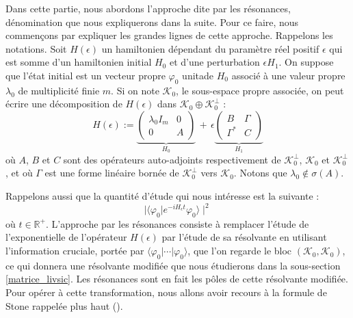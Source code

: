 \documentclass[12pt,openany,a4paper, titlepage]{article}
\newcommand{\R}{\mathbb{R}}
\newcommand{\vp}{\varphi}
\theoremstyle{definition}
\theoremstyle{definition}
\theoremstyle{definition}
\theoremstyle{definition}
\theoremstyle{definition}
\theoremstyle{definition}
\begin{document}
Dans cette partie, nous abordons l'approche dite par les résonances, dénomination que nous expliquerons dans la suite. Pour ce faire, nous commençons par expliquer les grandes lignes de cette approche.
Rappelons les notations. Soit $H(\epsilon)$ un hamiltonien dépendant du paramètre réel positif $\epsilon$ qui est somme d'un hamiltonien initial $H_0$ et d'une perturbation $\epsilon H_1$. On suppose que l'état initial est un vecteur propre $\vp_0$ unitade $H_0$ associé à une valeur propre $\lambda_0$ de multiplicité finie $m$. Si on note $\mathcal{K}_0$, le sous-espace propre associée, on peut écrire une décomposition de $H(\epsilon)$ dans $\mathcal{K}_0 \oplus \mathcal{K}_0^\perp$ : 
$$H(\epsilon) := 
\underbrace{\begin{pmatrix}
\lambda_0I_m & 0 \\
0    & A 
\end{pmatrix}}_{H_0} \,+\, \epsilon
\underbrace{\begin{pmatrix}
B        & \Gamma \\
\Gamma^* &  C
\end{pmatrix}}_{H_1}$$
où $A$, $B$ et $C$ sont des opérateurs auto-adjoints respectivement de $\mathcal{K}_0^\perp$, $\mathcal{K}_0$ et $\mathcal{K}_0^\perp$, et où $\Gamma$ est une forme linéaire bornée de $\mathcal{K}_0^\perp$ vers $\mathcal{K}_0$. Notons que $\lambda_0\notin\sigma(A)$. 

Rappelons aussi que la quantité d'étude qui nous intéresse est la suivante : 
\begin{equation}
    \mid \langle \vp_0 | e^{-iH_\epsilon t} \vp_0 \rangle\mid^2
\end{equation}
où $t\in\R^+$. L'approche par les résonances consiste à remplacer l'étude de l'exponentielle de l'opérateur $H(\epsilon)$ par l'étude de sa résolvante en utilisant l'information cruciale, portée par $\langle \vp_0 | \cdots |\vp_0 \rangle$,  que l'on regarde le bloc $(\mathcal{K}_0,\mathcal{K}_0)$, ce qui donnera une résolvante modifiée que nous étudierons dans la sous-section \ref{matrice_livsic}. Les résonances sont en fait les pôles de cette résolvante modifiée. Pour opérer à cette transformation, nous allons avoir recours à la formule de Stone rappelée plus haut ().\\
\end{document}

